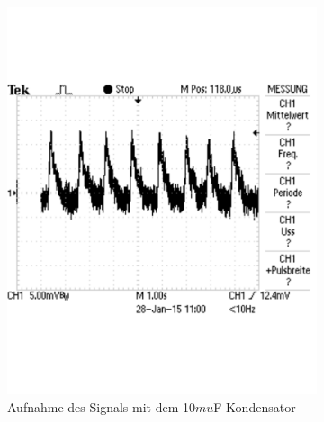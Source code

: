 \documentclass[12pt,a4paper]{article}
\begin{document}
\begin{figure}[H]
\begin{subfigure}[t]{0.28\textwidth}
                \includegraphics[width=\textwidth , scale = 0.4]{a3_mal10.pdf}
                \caption[Aufnahme des Signals mit dem 10$mu$F Kondensator ]{Aufnahme des Signals mit dem 10$mu$F Kondensator}
                \label{fig:3_mal}
        \end{subfigure}
        \hfill
        \begin{subfigure}[t]{0.28\textwidth}

\end{subfigure}
\end{figure}
\end{document}
